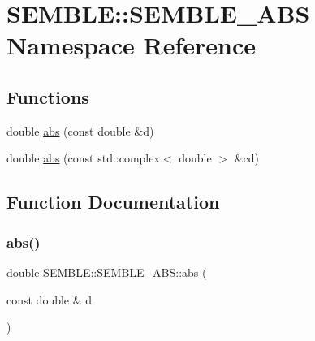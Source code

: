 \hypertarget{namespaceSEMBLE_1_1SEMBLE__ABS}{}\section{S\+E\+M\+B\+LE\+:\+:S\+E\+M\+B\+L\+E\+\_\+\+A\+BS Namespace Reference}
\label{namespaceSEMBLE_1_1SEMBLE__ABS}
\subsection*{Functions}
\begin{DoxyCompactItemize}
\item 
double \mbox{\hyperlink{namespaceSEMBLE_1_1SEMBLE__ABS_a908857ad13808705fb1109441c56233c}{abs}} (const double \&d)
\item 
double \mbox{\hyperlink{namespaceSEMBLE_1_1SEMBLE__ABS_a32a1647f54f2fcc6d9aca7dff1e0bea8}{abs}} (const std\+::complex$<$ double $>$ \&cd)
\end{DoxyCompactItemize}


\subsection{Function Documentation}
\mbox{\label{namespaceSEMBLE_1_1SEMBLE__ABS_a908857ad13808705fb1109441c56233c}} 
\subsubsection{\texorpdfstring{abs()}{abs()}\hspace{0.1cm}{\footnotesize\ttfamily [1/2]}}
{\footnotesize\ttfamily double S\+E\+M\+B\+L\+E\+::\+S\+E\+M\+B\+L\+E\+\_\+\+A\+B\+S\+::abs (\begin{DoxyParamCaption}\item[{const double \&}]{d }\end{DoxyParamCaption})}

